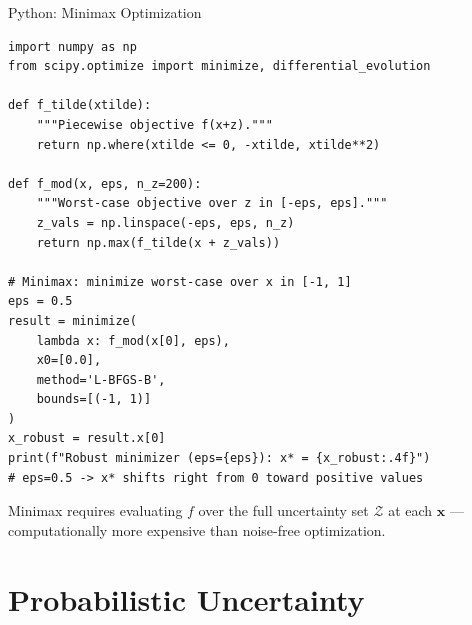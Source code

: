 \documentclass[aspectratio=169,10pt]{beamer}
\newcommand{\x}{\mathbf{x}}
\newcommand{\Z}{\mathcal{Z}}
\begin{document}
\begin{frame}[fragile]{Python: Minimax Optimization}
\begin{lstlisting}
import numpy as np
from scipy.optimize import minimize, differential_evolution

def f_tilde(xtilde):
    """Piecewise objective f(x+z)."""
    return np.where(xtilde <= 0, -xtilde, xtilde**2)

def f_mod(x, eps, n_z=200):
    """Worst-case objective over z in [-eps, eps]."""
    z_vals = np.linspace(-eps, eps, n_z)
    return np.max(f_tilde(x + z_vals))

# Minimax: minimize worst-case over x in [-1, 1]
eps = 0.5
result = minimize(
    lambda x: f_mod(x[0], eps),
    x0=[0.0],
    method='L-BFGS-B',
    bounds=[(-1, 1)]
)
x_robust = result.x[0]
print(f"Robust minimizer (eps={eps}): x* = {x_robust:.4f}")
# eps=0.5 -> x* shifts right from 0 toward positive values
\end{lstlisting}
\vspace{2pt}
{\small Minimax requires evaluating $f$ over the full uncertainty set $\Z$ at each $\x$ — computationally more expensive than noise-free optimization.}
\end{frame}

\section{Probabilistic Uncertainty}
\end{document}
